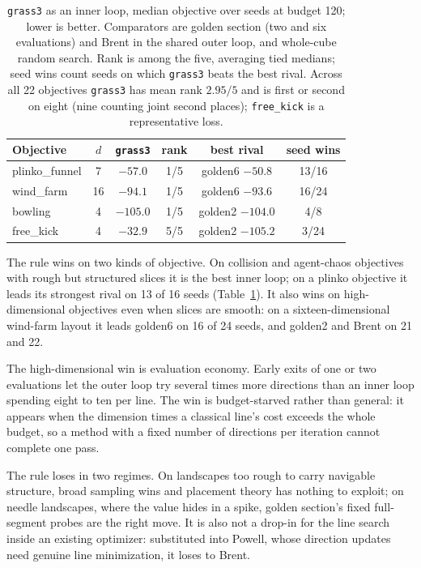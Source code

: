 \documentclass[11pt]{article}
\theoremstyle{itheads}
\begin{document}
\begin{table}[t]
\centering
\small
\begin{tabular}{lccccc}
\toprule
Objective & $d$ & \texttt{grass3} & rank & best rival & seed wins \\
\midrule
plinko\_funnel & 7  & $-57.0$  & 1/5 & golden6 $-50.8$  & 13/16 \\
wind\_farm     & 16 & $-94.1$  & 1/5 & golden6 $-93.6$  & 16/24 \\
bowling        & 4  & $-105.0$ & 1/5 & golden2 $-104.0$ & 4/8   \\
free\_kick     & 4  & $-32.9$  & 5/5 & golden2 $-105.2$ & 3/24  \\
\bottomrule
\end{tabular}
\caption{\texttt{grass3} as an inner loop, median objective over seeds
at budget 120; lower is better. Comparators are golden section (two and
six evaluations) and Brent in the shared outer loop, and whole-cube
random search. Rank is among the five, averaging tied medians; seed
wins count seeds on which \texttt{grass3} beats the best rival. Across
all 22 objectives \texttt{grass3} has mean rank $2.95/5$ and is first or
second on eight (nine counting joint second places);
\texttt{free\_kick} is a representative loss.}
\label{tab:bench}
\end{table}

The rule wins on two kinds of objective. On collision and agent-chaos
objectives with rough but structured slices it is the best inner loop;
on a plinko objective it leads its strongest rival on 13 of 16 seeds
(Table~\ref{tab:bench}). It also wins on high-dimensional objectives even
when slices are smooth: on a sixteen-dimensional wind-farm layout it
leads golden6 on 16 of 24 seeds, and golden2 and Brent on 21 and 22.

The high-dimensional win is evaluation economy. Early exits of one or
two evaluations let the outer loop try several times more directions
than an inner loop spending eight to ten per line. The win is
budget-starved rather than general: it appears when the dimension times
a classical line's cost exceeds the whole budget, so a method with a
fixed number of directions per iteration cannot complete one pass.

The rule loses in two regimes. On landscapes too rough to carry
navigable structure, broad sampling wins and placement theory has
nothing to exploit; on needle landscapes, where the value hides in a
spike, golden section's fixed full-segment probes are the right move. It
is also not a drop-in for the line search inside an existing optimizer:
substituted into Powell, whose direction updates need genuine line
minimization, it loses to Brent.
\end{document}
